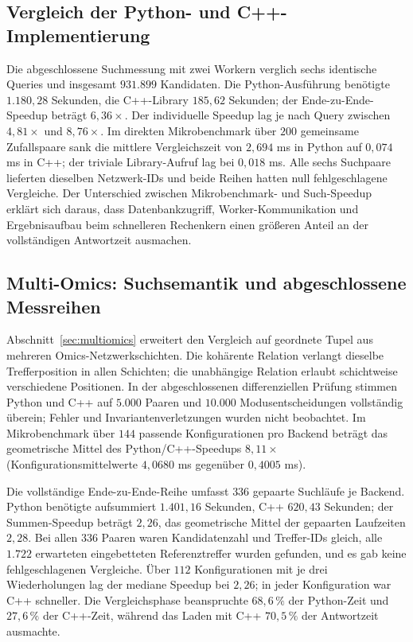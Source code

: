 \documentclass[a4paper,12pt, twoside]{report}
\theoremstyle{definition}
\begin{document}
\subsection{Vergleich der Python- und C++-Implementierung}

Die abgeschlossene Suchmessung mit zwei Workern verglich sechs identische Queries und insgesamt $931.899$ Kandidaten. Die Python-Ausführung benötigte $1.180{,}28$ Sekunden, die C++-Library $185{,}62$ Sekunden; der Ende-zu-Ende-Speedup beträgt $6{,}36\times$. Der individuelle Speedup lag je nach Query zwischen $4{,}81\times$ und $8{,}76\times$. Im direkten Mikrobenchmark über $200$ gemeinsame Zufallspaare sank die mittlere Vergleichszeit von $2{,}694$ ms in Python auf $0{,}074$ ms in C++; der triviale Library-Aufruf lag bei $0{,}018$ ms. Alle sechs Suchpaare lieferten dieselben Netzwerk-IDs und beide Reihen hatten null fehlgeschlagene Vergleiche. Der Unterschied zwischen Mikrobenchmark- und Such-Speedup erklärt sich daraus, dass Datenbankzugriff, Worker-Kommunikation und Ergebnisaufbau beim schnelleren Rechenkern einen größeren Anteil an der vollständigen Antwortzeit ausmachen.

\subsection{Multi-Omics: Suchsemantik und abgeschlossene Messreihen}
\label{sec:zus_multiomics}

Abschnitt~\ref{sec:multiomics} erweitert den Vergleich auf geordnete Tupel aus mehreren Omics-Netzwerkschichten. Die kohärente Relation verlangt dieselbe Trefferposition in allen Schichten; die unabhängige Relation erlaubt schichtweise verschiedene Positionen. In der abgeschlossenen differenziellen Prüfung stimmen Python und C++ auf $5.000$ Paaren und $10.000$ Modusentscheidungen vollständig überein; Fehler und Invariantenverletzungen wurden nicht beobachtet. Im Mikrobenchmark über $144$ passende Konfigurationen pro Backend beträgt das geometrische Mittel des Python/C++-Speedups $8{,}11\times$ (Konfigurationsmittelwerte $4{,}0680$ ms gegenüber $0{,}4005$ ms).

Die vollständige Ende-zu-Ende-Reihe umfasst $336$ gepaarte Suchläufe je Backend. Python benötigte aufsummiert $1.401{,}16$ Sekunden, C++ $620{,}43$ Sekunden; der Summen-Speedup beträgt $2{,}26$, das geometrische Mittel der gepaarten Laufzeiten $2{,}28$. Bei allen $336$ Paaren waren Kandidatenzahl und Treffer-IDs gleich, alle $1.722$ erwarteten eingebetteten Referenztreffer wurden gefunden, und es gab keine fehlgeschlagenen Vergleiche. Über $112$ Konfigurationen mit je drei Wiederholungen lag der mediane Speedup bei $2{,}26$; in jeder Konfiguration war C++ schneller. Die Vergleichsphase beanspruchte $68{,}6\,\%$ der Python-Zeit und $27{,}6\,\%$ der C++-Zeit, während das Laden mit C++ $70{,}5\,\%$ der Antwortzeit ausmachte.
\end{document}
